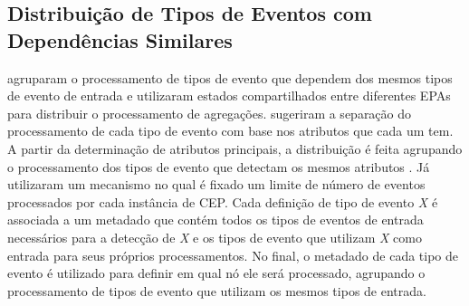 \subsection{{Distribuição de Tipos de Eventos com Dependências Similares}}
\label{sec:similarDep}
\cite{Isoyama:2012:SCE:2335484.2335498} agruparam o processamento de tipos de evento que dependem dos mesmos tipos de evento de entrada e utilizaram estados compartilhados entre diferentes EPAs para distribuir o processamento de agregações. \cite{Kobayashi:2015:CEP:2675743.2776771} sugeriram a separação do processamento de cada tipo de evento com base nos atributos que cada um tem. A partir da determinação de atributos principais, a distribuição é feita agrupando o processamento dos tipos de evento que detectam os mesmos atributos%
. Já \cite{7129184} utilizaram um mecanismo no qual
é fixado um limite de número de eventos processados por cada instância de CEP. Cada definição de tipo de evento \textit{X} é associada a um metadado que contém todos os tipos de eventos de entrada necessários para a detecção de \textit{X} e os tipos de evento que utilizam \textit{X} como entrada para seus próprios processamentos. No final, o metadado de cada tipo de evento é utilizado para definir em qual nó ele será processado, agrupando o processamento de tipos de evento que utilizam os mesmos tipos de entrada.%







